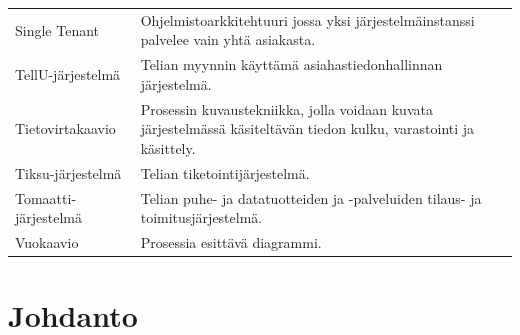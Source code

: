 \documentclass[finnish,12pt,a4paper,pdftex]{article}
\begin{document}
\begin{table}[h!]
\begin{tabular}{ p{5cm}  p{\textwidth-6cm} }
Single Tenant               & Ohjelmistoarkkitehtuuri jossa yksi järjestelmäinstanssi palvelee vain yhtä asiakasta.                                                            \\[0.9em]
TellU-järjestelmä           & Telian myynnin käyttämä asiahastiedonhallinnan järjestelmä.                                                                                      \\[0.9em]
Tietovirtakaavio            & Prosessin kuvaustekniikka, jolla voidaan kuvata järjestelmässä käsiteltävän tiedon kulku, varastointi ja käsittely.                              \\[0.9em]
Tiksu-järjestelmä           & Telian tiketointijärjestelmä.                                                                                                                    \\[0.9em]
Tomaatti-järjestelmä        & Telian puhe- ja datatuotteiden ja -palveluiden tilaus- ja toimitusjärjestelmä.                                                                   \\[0.9em]
Vuokaavio                   & Prosessia esittävä diagrammi.                                                                                                                   
\end{tabular}
\end{table}


\cleardoublepage
\storeinipagenumber
{}
\setcounter{page}{1}


\section{Johdanto}
\end{document}
